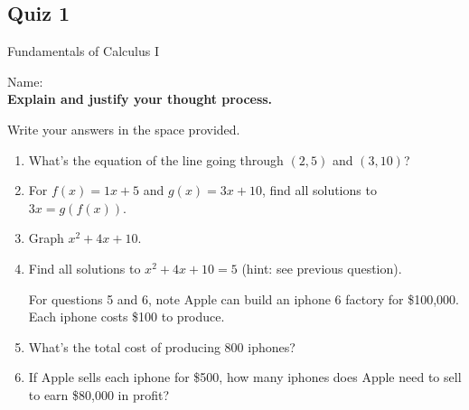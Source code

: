 \documentclass[a4paper, 12pt]{article}
\title{}
\date{}
\newcommand{\bt}[1]{\textbf{#1}} %
\begin{document}
\begin{center}
\section*{Quiz 1}
Fundamentals of Calculus I
\end{center}

Name: \underline{\hspace{5cm}} \\

\bt{Explain and justify your thought process.}

Write your answers in the space provided.

\begin{enumerate}
    \item What's the equation of the line going through $(2, 5)$ and $(3, 10)$?\\
    \vspace{6cm}

    \item For $f(x) = 1x + 5$ and $g(x) = 3x + 10$, find all solutions to $3x = g(f(x))$. \\
    \vspace{6cm}

    \item Graph $x^2 + 4x + 10$.
    
    \vspace{6cm}

    \item Find all solutions to $x^2 + 4x + 10 = 5$ (hint: see previous question).

    \vspace{6cm}
   For questions 5 and 6, note Apple can build an iphone 6 factory for \$100,000. Each iphone costs \$100 to produce. 
    \item What's the total cost of producing 800 iphones? \\

    \vspace{6cm}
    \item If Apple sells each iphone for \$500, how many iphones does Apple need to sell to earn \$80,000 in profit?
    \vspace{6cm}
\end{enumerate}
\end{document}

